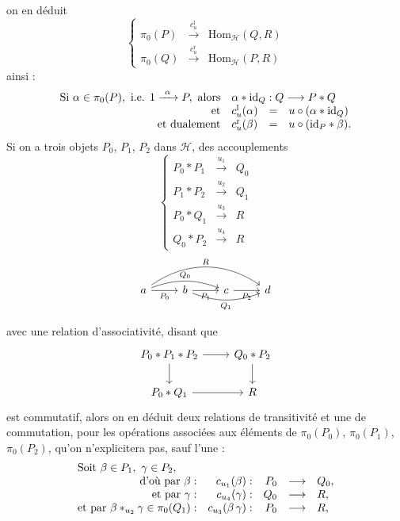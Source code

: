 \documentclass[11pt]{article}
\newcommand{\msp}[1]{\marginpar{\footnotesize [#1]}}
\begin{document}
on en déduit
\[
\left\{
\begin{array}{lcl}
\pi_0(P) & \xrightarrow{c_u^{\mathrm{l}}} & \mathrm{Hom}_{\mathcal{H}}(Q,R)\\
\pi_0(Q) & \xrightarrow{c_u^{\mathrm{r}}} & \mathrm{Hom}_{\mathcal{H}}(P,R)
\end{array}
\right.
\]
ainsi :
\[
\begin{array}{rlcl}
\text{Si } \alpha\in\pi_0(P),\ \text{i.e. } 1\xrightarrow{\ \alpha\ }P,\ \text{alors} & \multicolumn{3}{l}{\alpha*\mathrm{id}_Q : Q\longrightarrow P*Q}\\
\text{et} & c^{\mathrm{l}}_u(\alpha) & = & u\circ(\alpha*\mathrm{id}_Q)\\
\text{et dualement} & c^{\mathrm{r}}_u(\beta) & = & u\circ(\mathrm{id}_P*\beta).
\end{array}
\]
Si on a trois objets $P_0$, $P_1$, $P_2$ dans $\mathcal{H}$, des accouplements
\[
\left\{
\begin{array}{rcl}
P_0*P_1 & \xrightarrow{u_1} & Q_0\\
P_1*P_2 & \xrightarrow{u_2} & Q_1\\
P_0*Q_1 & \xrightarrow{u_3} & R\\
Q_0*P_2 & \xrightarrow{u_4} & R
\end{array}
\right.
\]
\[
\begin{tikzcd}
a \arrow[r, "P_0"'] \arrow[rr, bend left=20, "Q_0"] \arrow[rrr, bend left=35, "R"] & b \arrow[r, "P_1"'] \arrow[rr, bend right=20, "Q_1"'] & c \arrow[r, "P_2"'] & d
\end{tikzcd}
\]

\msp{page 6}
avec une relation d'associativité, disant que
\[
\begin{tikzcd}
P_0*P_1*P_2 \arrow[r] \arrow[d] & Q_0*P_2 \arrow[d]\\
P_0*Q_1 \arrow[r] & R
\end{tikzcd}
\]
est commutatif, alors on en déduit deux relations de transitivité et une de commutation, pour les opérations associées aux éléments de $\pi_0(P_0)$, $\pi_0(P_1)$, $\pi_0(P_2)$, qu'on n'explicitera pas, sauf l'une :
\[
\begin{array}{rrrcl}
\multicolumn{5}{l}{\text{Soit } \beta\in P_1,\ \gamma\in P_2,}\\
\text{d'où par } \beta : & c_{u_1}(\beta) : & P_0 & \longrightarrow & Q_0,\\
\text{et par } \gamma : & c_{u_4}(\gamma) : & Q_0 & \longrightarrow & R,\\
\text{et par } \beta *_{u_2}\gamma\in\pi_0(Q_1) : & c_{u_3}(\beta\,\gamma) : & P_0 & \longrightarrow & R,
\end{array}
\]
\end{document}

